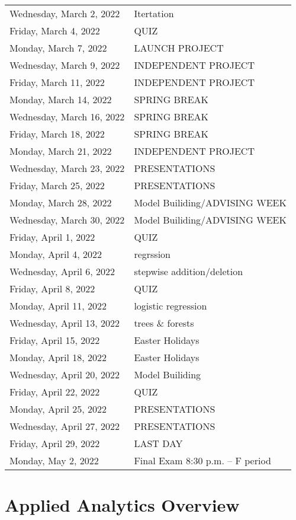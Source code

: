 \documentclass[
]{book}
\theoremstyle{definition}
\theoremstyle{definition}
\theoremstyle{definition}
\theoremstyle{definition}
\theoremstyle{remark}
\begin{document}
\begin{longtable}[]{@{}ll@{}}
Wednesday, March 2, 2022 & Itertation \\
Friday, March 4, 2022 & QUIZ \\
Monday, March 7, 2022 & LAUNCH PROJECT \\
Wednesday, March 9, 2022 & INDEPENDENT PROJECT \\
Friday, March 11, 2022 & INDEPENDENT PROJECT \\
Monday, March 14, 2022 & SPRING BREAK \\
Wednesday, March 16, 2022 & SPRING BREAK \\
Friday, March 18, 2022 & SPRING BREAK \\
Monday, March 21, 2022 & INDEPENDENT PROJECT \\
Wednesday, March 23, 2022 & PRESENTATIONS \\
Friday, March 25, 2022 & PRESENTATIONS \\
Monday, March 28, 2022 & Model Builiding/ADVISING WEEK \\
Wednesday, March 30, 2022 & Model Builiding/ADVISING WEEK \\
Friday, April 1, 2022 & QUIZ \\
Monday, April 4, 2022 & regrssion \\
Wednesday, April 6, 2022 & stepwise addition/deletion \\
Friday, April 8, 2022 & QUIZ \\
Monday, April 11, 2022 & logistic regression \\
Wednesday, April 13, 2022 & trees \& forests \\
Friday, April 15, 2022 & Easter Holidays \\
Monday, April 18, 2022 & Easter Holidays \\
Wednesday, April 20, 2022 & Model Builiding \\
Friday, April 22, 2022 & QUIZ \\
Monday, April 25, 2022 & PRESENTATIONS \\
Wednesday, April 27, 2022 & PRESENTATIONS \\
Friday, April 29, 2022 & LAST DAY \\
Monday, May 2, 2022 & Final Exam 8:30 p.m. -- F period \\
\bottomrule
\end{longtable}

\hypertarget{applied-analytics-overview}{%
\chapter{Applied Analytics Overview}\label{applied-analytics-overview}}
\end{document}
